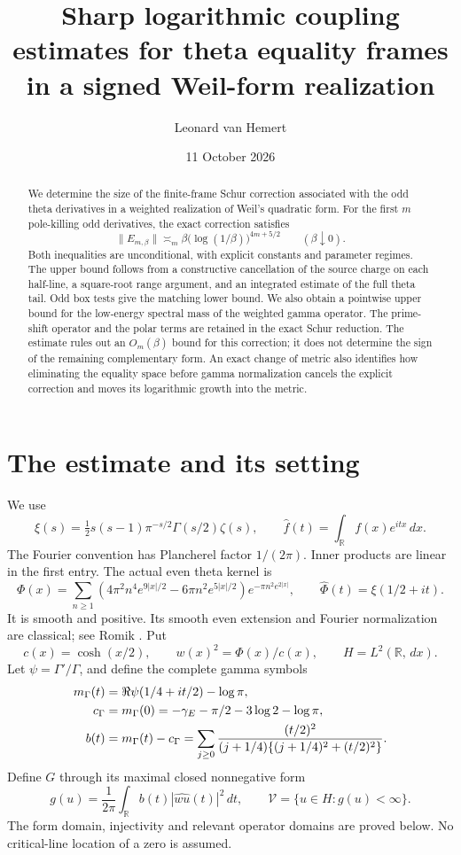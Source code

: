 \documentclass[11pt]{article}
\title{Sharp logarithmic coupling estimates for theta equality frames\\
in a signed Weil-form realization}
\author{Leonard van Hemert}
\date{11 October 2026}
\theoremstyle{remark}
\newcommand{\dd}{\,d}
\newcommand{\R}{\mathbb R}
\begin{document}
\maketitle
\begin{abstract}
We determine the size of the finite-frame Schur correction associated
with the odd theta derivatives in a weighted realization of Weil's
quadratic form. For the first \(m\) pole-killing odd derivatives,
the exact correction satisfies
\[
 \|E_{m,\beta}\|\asymp_m
       \beta\bigl(\log(1/\beta)\bigr)^{4m+5/2}
       \qquad(\beta\downarrow0).
\]
Both inequalities are unconditional, with explicit constants and
parameter regimes. The upper bound follows from a constructive
cancellation of the source charge on each half-line, a square-root
range argument, and an integrated estimate of the full theta tail.
Odd box tests give the matching lower bound. We also obtain a
pointwise upper bound for the low-energy spectral mass of the
weighted gamma operator. The prime-shift operator and the polar
terms are retained in the exact Schur reduction. The estimate rules
out an \(O_m(\beta)\) bound for this correction; it does not determine
the sign of the remaining complementary form. An exact change of
metric also identifies how eliminating the equality space before
gamma normalization cancels the explicit correction and moves
its logarithmic growth into the metric.
\end{abstract}

\section{The estimate and its setting}

We use
\[
 \xi(s)=\tfrac12s(s-1)\pi^{-s/2}\Gamma(s/2)\zeta(s),\qquad
 \widehat f(t)=\int_{\R}f(x)e^{itx}\dd x.
\]
The Fourier convention has Plancherel factor \(1/(2\pi)\).
Inner products are linear in the first entry. The actual even
theta kernel is
\begin{equation}\label{phi}
 \Phi(x)=\sum_{n\ge1}
 (4\pi^2n^4e^{9|x|/2}-6\pi n^2e^{5|x|/2})
                    e^{-\pi n^2e^{2|x|}},
 \qquad \widehat\Phi(t)=\xi(1/2+it).
\end{equation}
It is smooth and positive. Its smooth even extension and Fourier
normalization are classical; see Romik
\cite[(1.8)--(1.11), printed p.~2]{Romik}.
Put
\[
 c(x)=\cosh(x/2),\qquad w(x)^2=\Phi(x)/c(x),\qquad H=L^2(\R,\dd x).
\]
Let \(\psi=\Gamma'/\Gamma\), and define the complete gamma symbols
\begin{align}
 m_\Gamma(t)&=\Re\psi(1/4+it/2)-\log\pi,\notag\\
 c_\Gamma&=m_\Gamma(0)
   =-\gamma_E-\pi/2-3\log2-\log\pi,\notag\\
 b(t)&=m_\Gamma(t)-c_\Gamma
 =\sum_{j\ge0}\frac{(t/2)^2}
 {(j+1/4)\{(j+1/4)^2+(t/2)^2\}}.\label{symbol}
\end{align}
Define \(G\) through its maximal closed nonnegative form
\begin{equation}\label{g}
 g(u)=\frac1{2\pi}\int_\R b(t)|\widehat{wu}(t)|^2\dd t,\qquad
 \mathcal V=\{u\in H:g(u)<\infty\}.
\end{equation}
The form domain, injectivity and relevant operator domains are proved
below. No critical-line location of a zero is assumed.
\end{document}
